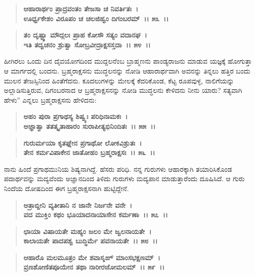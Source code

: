 \begin{verse}
\textbf{ಆಹಾರಾರ್ಥಂ ಪ್ರಾದ್ರವಂತಂ ತೇಜಸಾ ಚ ನಿವರ್ತಿತಃ~।}\\\textbf{ಊರ್ಧ್ವಕೇಶಂ ವಿರೂಪಂ ಚ ಚಲಜಿಹ್ವಂ ದಿಗಂಬರಮ್~।। ೫೩~।।}
\end{verse}

\begin{verse}
\textbf{ತಂ ದೃಷ್ಟ್ವಾ ಮೌದ್ಗಲಃ ಪ್ರಾಹ ಕೋಸೌ ಸತ್ಯಂ ವದಾನಘ~।}\\\textbf{ಇತಿ ತದ್ವಚನಂ ಶ್ರುತ್ವಾ ಸೋಬ್ರವೀದ್ರಾಕ್ಷಸಸ್ತದಾ~।। ೫೪~।।}
\end{verse}

ಹೀಗಿರಲು ಒಂದು ದಿನ ದೈವಯೋಗದಿಂದ ಮುದ್ದಲನೆಂಬ ಬ್ರಾಹ್ಮಣನು ಪಾಂಡ್ಯರಾಜನು ಮಾಡುವ ಯಜ್ಞಕ್ಕೆ ಹೋಗುತ್ತಾ ಆ ಮಾರ್ಗದಲ್ಲಿ ಬಂದನು. ಬ್ರಹ್ಮರಾಕ್ಷಸನು ಮುದ್ಧಲನನ್ನು ನೋಡಿ ಆಹಾರಾರ್ಥವಾಗಿ ಅವನನ್ನು ತಿನ್ನಲು ಹತ್ತಿರ ಬಂದು ಮುಲನ ತೇಜಸ್ಸಿನಿಂದ ಹಿಂತೆಗೆದನು. ಕೂದಲುಗಳನ್ನು ಮೇಲಕ್ಕೆ ಕೆದರಿಕೊಂಡ, ಕೆಟ್ಟ ರೂಪವುಳ್ಳ, ನಾಲಿಗೆಯನ್ನು ಅಲ್ಲಾಡಿಸುತ್ತಿರುವ, ದಿಗಂಬರನಾದ ಆ ಬ್ರಹ್ಮರಾಕ್ಷಸನನ್ನು ನೋಡಿ ಮುದ್ಧಲನು ಕೇಳಿದನು ನೀನು ಯಾರು? ಸತ್ಯವಾಗಿ ಹೇಳು” ಎನ್ನಲು ಬ್ರಹ್ಮರಾಕ್ಷಸನು ಹೇಳಿದನು:

\begin{verse}
\textbf{ಅಹಂ ಪುರಾ ಪ್ರಗಾಥಸ್ಯ ಶಿಷ್ವ್ಯಃ ಪರಿಧಿನಾಮಕಃ~।}\\\textbf{ಅಜ್ಞಾತ್ವಾ ತತತ್ಕೃತಾಹಾರಂ ಸುರಾಪೀತ್ಯಭಿನಿಂದಿತಃ~।। ೫೫~।। }
\end{verse}

\begin{verse}
\textbf{ಗುರುರ್ಮಯಾ ಕೃತಘ್ನೇನ ಪ್ರಗಾಥೋ ಲೋಕವಿಶ್ರುತಃ~।}\\\textbf{ತೇನ ಕರ್ಮವಿಪಾಕೇನ ಜಾತೋಹಂ ಬ್ರಹ್ಮರಾಕ್ಷಸಃ~।। ೫೬~।।}
\end{verse}

ನಾನು ಹಿಂದೆ ಪ್ರಗಾಥಮುನಿಯ ಶಿಷ್ಯನಾಗಿದ್ದೆ. ಹೆಸರು ಪರಿಧಿ. ನನ್ನ ಗುರುಗಳು ಆಹಾರಕ್ಕಾಗಿ ತಯಾರಿಸಿಕೊಂಡ ಪದಾರ್ಥವನ್ನು ಮದ್ಯವೆಂದು ಅಜ್ಞಾನದಿಂದ ತಿಳಿದು ಗುರುಗಳು ಮದ್ಯಪಾನ ಮಾಡುತ್ತಾರೆಂದು ದೂಷಿಸಿದೆ. ಆ ಗುರು ನಿಂದೆಯ ದೋಷದಿಂದ ಈಗ ಬ್ರಹ್ಮರಾಕ್ಷಸನಾಗಿ ಹುಟ್ಟಿದ್ದೇನೆ.

\begin{verse}
\textbf{ಅತ್ರಾಬ್ದೀನಿ ವ್ಯತೀತಾನಿ ನ ಜಾನೇ ನಿರ್ಜನೇ ವನೇ~।}\\\textbf{ವದ ಮುಕ್ತಿಂ ಕಥಂ ಭೂಯಾದನಾಯಾಸೇನ ಕರ್ಮಣಾ~।। ೫೭~।।} 
\end{verse}

\begin{verse}
\textbf{ಛಾಯಾ ವಿಷಾಯತೇ ಮಹ್ಯಂ ಜಲಂ ಮೇ ಜ್ವಲನಾಯತೇ~।}\\\textbf{ಕಾಲಾಯತೇ ಪಾದಪಶ್ವ ಬುದ್ಧಿರ್ಮೆ ಪವನಾಯತೇ~।। ೫೮~।। }
\end{verse}

\begin{verse}
\textbf{ಆಹಾರೊ ಮಲಮೂತ್ರಂ ಮೇ ಶವಾಸೃಙ್ ಮಾಂಸಭಕ್ಷಣಮ್~।}\\\textbf{ವ್ರಣಶೋಣಿತಪೂಯೇನ ತಥಾ ನಾರೀರಜೋಮಲಮ್~।। ೫೯~।। }
\end{verse}

